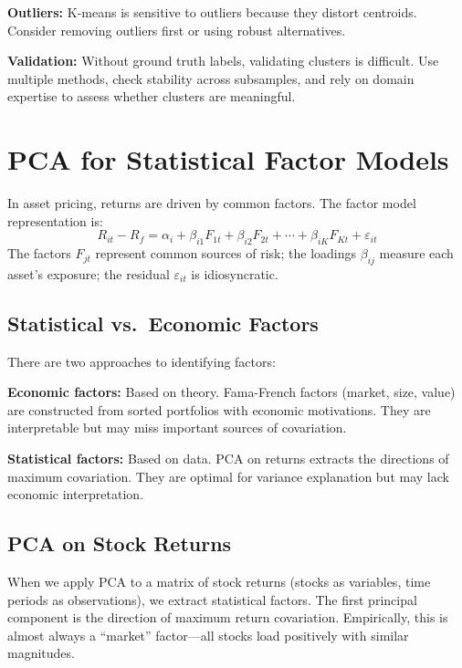 \documentclass[11pt,a4paper]{article}
\begin{document}
\textbf{Outliers:} K-means is sensitive to outliers because they distort centroids. Consider removing outliers first or using robust alternatives.

\textbf{Validation:} Without ground truth labels, validating clusters is difficult. Use multiple methods, check stability across subsamples, and rely on domain expertise to assess whether clusters are meaningful.

\section{PCA for Statistical Factor Models}

In asset pricing, returns are driven by common factors. The factor model representation is:
\[
R_{it} - R_f = \alpha_i + \beta_{i1} F_{1t} + \beta_{i2} F_{2t} + \cdots + \beta_{iK} F_{Kt} + \varepsilon_{it}
\]
The factors $F_{jt}$ represent common sources of risk; the loadings $\beta_{ij}$ measure each asset's exposure; the residual $\varepsilon_{it}$ is idiosyncratic.

\subsection{Statistical vs.\ Economic Factors}

There are two approaches to identifying factors:

\textbf{Economic factors:} Based on theory. Fama-French factors (market, size, value) are constructed from sorted portfolios with economic motivations. They are interpretable but may miss important sources of covariation.

\textbf{Statistical factors:} Based on data. PCA on returns extracts the directions of maximum covariation. They are optimal for variance explanation but may lack economic interpretation.

\subsection{PCA on Stock Returns}

When we apply PCA to a matrix of stock returns (stocks as variables, time periods as observations), we extract statistical factors. The first principal component is the direction of maximum return covariation. Empirically, this is almost always a ``market'' factor---all stocks load positively with similar magnitudes.
\end{document}
